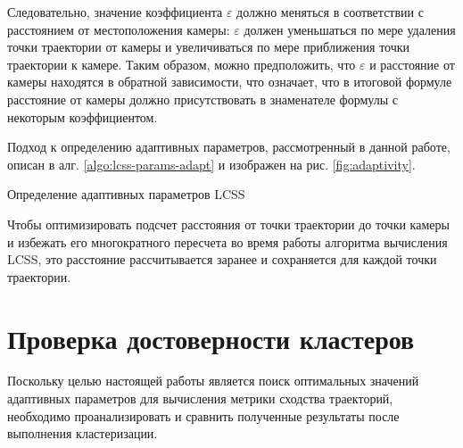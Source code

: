 Следовательно, значение коэффициента $\varepsilon$ должно меняться в соответствии с расстоянием от местоположения камеры: $\varepsilon$ должен уменьшаться по мере удаления точки траектории от камеры и увеличиваться по мере приближения точки траектории к камере. Таким образом, можно предположить, что $\varepsilon$ и расстояние от камеры находятся в обратной зависимости, что означает, что в итоговой формуле расстояние от камеры должно присутствовать в знаменателе формулы с некоторым коэффициентом.

Подход к определению адаптивных параметров, рассмотренный в данной работе, описан в алг. \ref{algo:lcss-params-adapt} и изображен на рис. \ref{fig:adaptivity}.

\begin{algorithm}[!htb]
	\caption{Определение адаптивных параметров LCSS}
	\label{algo:lcss-params-adapt}
	\SetAlgoLined
\end{algorithm}


Чтобы оптимизировать подсчет расстояния от точки траектории до точки камеры и избежать его многократного пересчета во время работы алгоритма вычисления LCSS, это расстояние рассчитывается заранее и сохраняется для каждой точки траектории.

\section{Проверка достоверности кластеров}

Поскольку целью настоящей работы является поиск оптимальных значений адаптивных параметров для вычисления метрики сходства траекторий, необходимо проанализировать и сравнить полученные результаты после выполнения кластеризации.

